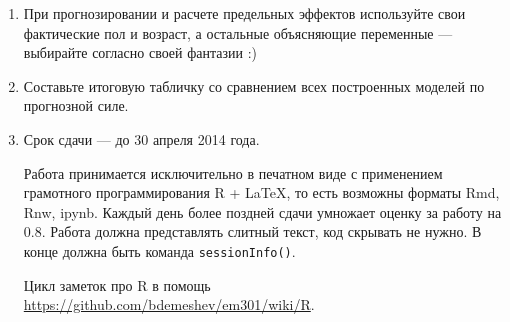 \documentclass[a4paper]{article}
\begin{document}
\begin{enumerate}
\item При прогнозировании и расчете предельных эффектов используйте свои фактические пол и возраст, а остальные объясняющие переменные --- выбирайте согласно своей фантазии :)

\item Составьте итоговую табличку со сравнением всех построенных моделей по прогнозной силе.

\item Срок сдачи --- до 30 апреля 2014 года.

Работа принимается исключительно в печатном виде с применением грамотного программирования R + \LaTeX, то есть возможны форматы Rmd, Rnw, ipynb. Каждый день более поздней сдачи умножает оценку за работу на $0.8$.  Работа должна представлять слитный текст, код скрывать не нужно. В конце должна быть команда \verb|sessionInfo()|.


Цикл заметок про R в помощь \url{https://github.com/bdemeshev/em301/wiki/R}.

\end{enumerate}
\end{document}
